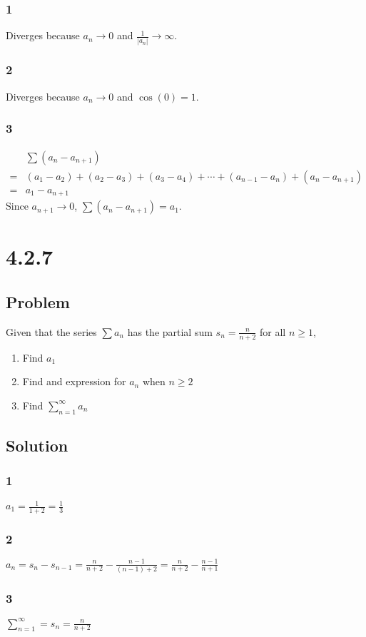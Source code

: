 \documentclass[12pt]{article}
\newcommand{\abs}  [1]{\left|       #1 \right|      }
\begin{document}
\subsubsection*{1}
Diverges because $a_n \to 0$ and $\frac{1}{\abs{a_n}} \to \infty$.

\subsubsection*{2}
Diverges because $a_n \to 0$ and $\cos(0) = 1$.

\subsubsection*{3}
\begin{align*}
     & \sum (a_n - a_{n+1}) \\
    =& (a_1 - a_2) + (a_2 - a_3) + (a_3 - a_4) + \cdots + (a_{n-1} - a_n) + (a_n - a_{n+1}) \\
    =& a_1 - a_{n+1}
\end{align*}
Since $a_{n+1} \to 0$, $\sum (a_n - a_{n+1}) = a_1$.



\section*{4.2.7}

\subsection*{Problem}
Given that the series $\sum a_n$ has the partial sum $s_n = \frac{n}{n+2}$ for all $n \geq 1$,
\begin{enumerate}
    \item Find $a_1$
    \item Find and expression for $a_n$ when $n \geq 2$
    \item Find $\sum_{n=1}^\infty a_n$
\end{enumerate}

\subsection*{Solution}

\subsubsection*{1}
$a_1 = \frac{1}{1+2} = \frac{1}{3}$

\subsubsection*{2}
$a_n = s_n - s_{n-1} = \frac{n}{n+2} - \frac{n-1}{(n-1)+2} = \frac{n}{n+2} - \frac{n-1}{n+1}$

\subsubsection*{3}
$\sum_{n=1}^\infty = s_n = \frac{n}{n+2}$
\end{document}
